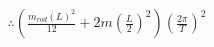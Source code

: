 \documentclass[preview]{standalone}
\begin{document}
\begin{align*}
\therefore (\frac{m_{rod}(L)^2}{12} + 2m(\frac{L}{2})^2)(\frac{2\pi}{T})^2
\end{align*}
\end{document}

